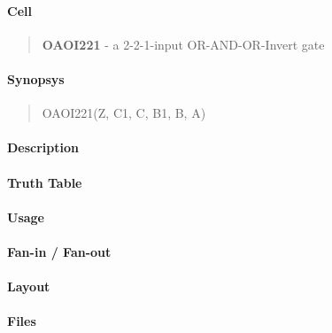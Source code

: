 \label{OAOI221}
\paragraph{Cell}
\begin{quote}
    \textbf{OAOI221} - a 2-2-1-input OR-AND-OR-Invert gate
\end{quote}

\paragraph{Synopsys}
\begin{quote}
    OAOI221(Z, C1, C, B1, B, A)
\end{quote}

\paragraph{Description}

%

\paragraph{Truth Table}
%

\paragraph{Usage}

\paragraph{Fan-in / Fan-out}

\paragraph{Layout}

\paragraph{Files}
